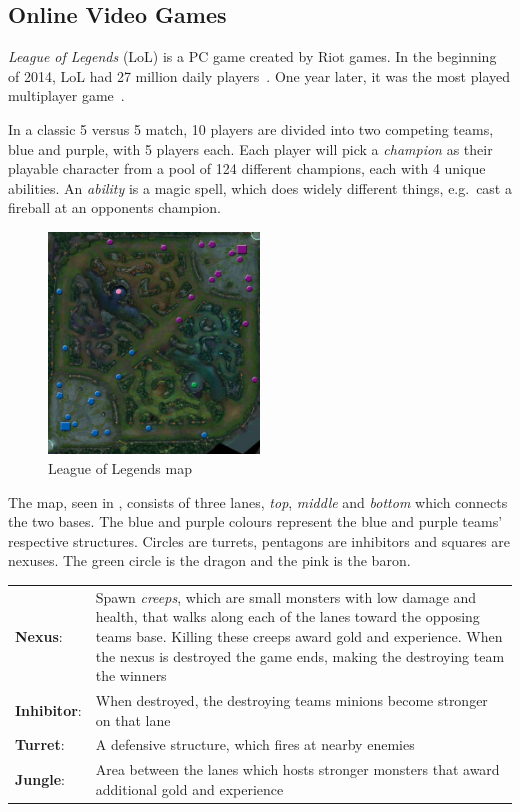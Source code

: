 \subsection{Online Video Games}\label{sec:onlinevideogames}
\emph{League of Legends} (LoL) is a PC game created by Riot games. In the beginning of 2014, LoL had 27 million daily players~\cite{LoL27mill}. One year later, it was the most played multiplayer game~\cite{LoLmostplayed}.

In a classic 5 versus 5 match, 10 players are divided into two competing teams, blue and purple, with 5 players each. Each player will pick a \emph{champion} as their playable character from a pool of 124 different champions, each with 4 unique abilities. An \emph{ability} is a magic spell, which does widely different things, e.g.\ cast a fireball at an opponents champion.

\begin{figure}[!htb]
  \centering
    \includegraphics[width=0.5\textwidth]{img/lolmap.jpg}
  \caption{League of Legends map~\cite{lolmap}}\label{fig:lolmap}
\end{figure}

The map, seen in , consists of three lanes, \emph{top}, \emph{middle} and \emph{bottom} which connects the two bases. The blue and purple colours represent the blue and purple teams' respective structures. Circles are turrets, pentagons are inhibitors and squares are nexuses. The green circle is the dragon and the pink is the baron.

\begin{table}[!h]
  \begin{tabular}{l p{13cm}}
    \textbf{Nexus}: & Spawn \emph{creeps}, which are small monsters with low damage and health, that walks along each of the lanes toward the opposing teams base. Killing these creeps award gold and experience. When the nexus is destroyed the game ends, making the destroying team the winners\\
    \textbf{Inhibitor}: & When destroyed, the destroying teams minions become stronger on that lane\\
    \textbf{Turret}: & A defensive structure, which fires at nearby enemies\\
    \textbf{Jungle}: & Area between the lanes which hosts stronger monsters that award additional gold and experience\\
  \end{tabular}
\end{table}

